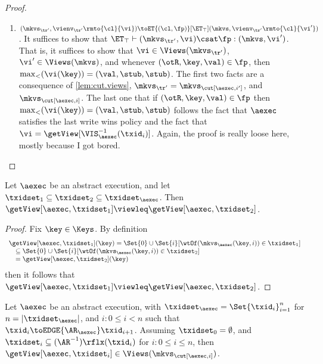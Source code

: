 \begin{proof}
\begin{itemize}
\begin{enumerate}
\item $(\mkvs_{\tr'}, \vienv_{\tr'}\rmto{\cl}{\vi}) \toET{(\cl, \fp)}[\ET_{\top}] (\mkvs,  \vienv_{\tr'}\rmto{\cl}{\vi'})$. 
    It suffices to show that $\ET_{\top} \vdash (\mkvs_{\tr'}, \vi) \csat \fp: (\mkvs,\vi')$. 
That is, it suffices to show that $\vi \in \Views(\mkvs_{\tr'})$, $\vi' \in \Views(\mkvs)$, 
and whenever $(\otR, \key, \val) \in \fp$, then $\max_{<}(\vi(\key)) = (\val, \stub, \stub)$. 
The first two facts are a consequence of \cref{lem:cut.views}, $\mkvs_{\tr'} = \mkvs_{\cut[\aexec, i']}$, and  $\mkvs_{\cut[\aexec, i]}$. 
The last one that if $(\otR, \key, \val) \in \fp$ then $\max_{<}(\vi(\key)) = (\val, \stub, \stub)$ follows the fact that 
$\aexec$ satisfies the last write wins policy and the fact that $\vi = \getView[\VIS^{-1}_{\aexec}(\txid_{i})]$.
\ac{Again, the proof is really loose here, mostly because I got bored.}
\end{enumerate} 

\end{itemize}
\end{proof}

\begin{lemma}
\label{lem:getView.monotone}
Let $\aexec$ be an abstract execution, and let $\txidset_1 \subseteq \txidset_2 \subseteq \txidset_{\aexec}$. 
Then $\getView[\aexec, \txidset_1] \viewleq \getView[\aexec, \txidset_2]$.
\end{lemma}
\begin{proof}
Fix $\key \in \Keys$. By definition  
\[
\begin{array}{l}
    \getView[\aexec, \txidset_1](\key) = \Set{0} \cup \Set{i}[\wtOf(\mkvs_{\aexec}(\key, i)) \in \txidset_1] \\
    \quad \subseteq \Set{0} \cup \Set{i}[\wtOf(\mkvs_{\aexec}(\key, i)) \in \txidset_2] \\
\quad = \getView[\aexec, \txidset_2](\key)
\end{array}
\]
then it follows that  $\getView[\aexec, \txidset_1] \viewleq \getView[\aexec, \txidset_2]$.
\end{proof}

\begin{lemma}
\label{lem:cut.views}
Let $\aexec$ be an abstract execution, with $\txidset_{\aexec} = \Set{\txid_{i}}_{i = 1}^{n}$ for 
$n = \lvert \txidset_{\aexec} \rvert$, and \( i : 0 \leq i < n\) such that $\txid_{i} \toEDGE{\AR_{\aexec}} \txid_{i+1}$.
Assuming $\txidset_{0} = \emptyset$, and $\txidset_{i} \subseteq (\AR^{-1})\rflx(\txid_{i})$ for $i : 0 \leq i \leq n$,
then $\getView[\aexec, \txidset_{i}] \in \Views(\mkvs_{\cut[\aexec, i]})$.
\end{lemma}


